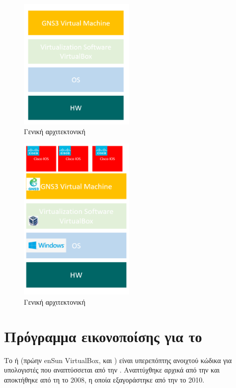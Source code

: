 \begin{figure}[htb]
	\centering
	\includegraphics[width=0.5\textwidth]{graphics/Architecture_virtualbox.PNG}
	\caption{ Γενική αρχιτεκτονική}
\end{figure}

\begin{figure}[htb]
	\centering
	\includegraphics[width=0.5\textwidth]{graphics/virtualization_architecture.PNG}
	\caption{ Γενική αρχιτεκτονική}
\end{figure}

\section{Πρόγραμμα εικονοποίσης για το }

Το  ή  (πρώην en{Sun VirtualBox},  και ) είναι υπερεπόπτης
ανοιχτού κώδικα για υπολογιστές  που αναπτύσσεται από την .
Αναπτύχθηκε αρχικά από την 
και αποκτήθηκε από τη  το 2008, η οποία εξαγοράστηκε από την  το 2010.

